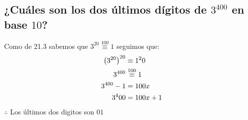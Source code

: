     \subsection{¿Cuáles son los dos últimos dígitos de $3^{400}$ en base $10$?}
        Como de 21.3 sabemos que $3^{20} \stackrel{100}{\equiv} 1$ seguimos que: \\
        \begin{align}
            \notag \left(3^{20}\right)^{20} &\equiv 1^20 \\
            \notag 3^{400} &\stackrel{100}{\equiv} 1 \\
            \notag 3^{400}-1 &= 100x \\
            \notag 3^400 &= 100x+1
        \end{align}
        $\therefore$ Los últimos dos digitos son $01$